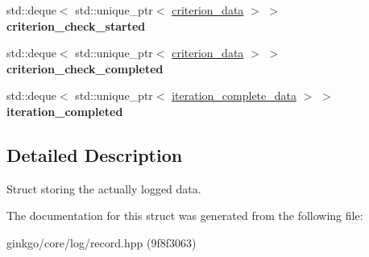 \begin{DoxyCompactItemize}
\item 
\mbox{\label{structgko_1_1log_1_1Record_1_1logged__data_abfe68110796c0a094c937d3a8787cc04}} 
std\+::deque$<$ std\+::unique\+\_\+ptr$<$ \hyperlink{structgko_1_1log_1_1criterion__data}{criterion\+\_\+data} $>$ $>$ {\bfseries criterion\+\_\+check\+\_\+started}
\item 
\mbox{\label{structgko_1_1log_1_1Record_1_1logged__data_abf13cae8d7e797ae6c2b4ddf9a9cb33a}} 
std\+::deque$<$ std\+::unique\+\_\+ptr$<$ \hyperlink{structgko_1_1log_1_1criterion__data}{criterion\+\_\+data} $>$ $>$ {\bfseries criterion\+\_\+check\+\_\+completed}
\item 
\mbox{\label{structgko_1_1log_1_1Record_1_1logged__data_a54f71b0aecebe7a7957eb5cfba7395e3}} 
std\+::deque$<$ std\+::unique\+\_\+ptr$<$ \hyperlink{structgko_1_1log_1_1iteration__complete__data}{iteration\+\_\+complete\+\_\+data} $>$ $>$ {\bfseries iteration\+\_\+completed}
\end{DoxyCompactItemize}


\subsection{Detailed Description}
Struct storing the actually logged data. 

The documentation for this struct was generated from the following file\+:\begin{DoxyCompactItemize}
\item 
ginkgo/core/log/record.\+hpp (9f8f3063)\end{DoxyCompactItemize}
